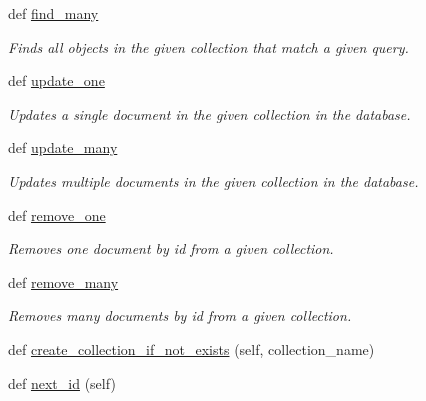 \begin{DoxyCompactItemize}
def \hyperlink{classNEAT__PyGenetics_1_1NEAT_1_1Tests_1_1MockClasses_1_1mock__DatabaseConnector_1_1mock__DatabaseConnector_a0ea2557b31cd7af3af9e098cc8dd3f7d}{find\+\_\+many}
\begin{DoxyCompactList}\small\item\em Finds all objects in the given collection that match a given query. \end{DoxyCompactList}\item 
def \hyperlink{classNEAT__PyGenetics_1_1NEAT_1_1Tests_1_1MockClasses_1_1mock__DatabaseConnector_1_1mock__DatabaseConnector_a01f612634b7f3da00fb1b327dfa5b524}{update\+\_\+one}
\begin{DoxyCompactList}\small\item\em Updates a single document in the given collection in the database. \end{DoxyCompactList}\item 
def \hyperlink{classNEAT__PyGenetics_1_1NEAT_1_1Tests_1_1MockClasses_1_1mock__DatabaseConnector_1_1mock__DatabaseConnector_a9fa32e7c0e425396238b66ab8f3ffb5e}{update\+\_\+many}
\begin{DoxyCompactList}\small\item\em Updates multiple documents in the given collection in the database. \end{DoxyCompactList}\item 
def \hyperlink{classNEAT__PyGenetics_1_1NEAT_1_1Tests_1_1MockClasses_1_1mock__DatabaseConnector_1_1mock__DatabaseConnector_a534ae334b83f54bce7d32f66faf22440}{remove\+\_\+one}
\begin{DoxyCompactList}\small\item\em Removes one document by id from a given collection. \end{DoxyCompactList}\item 
def \hyperlink{classNEAT__PyGenetics_1_1NEAT_1_1Tests_1_1MockClasses_1_1mock__DatabaseConnector_1_1mock__DatabaseConnector_ab3ff82b4de49e912a56c7b3cd0a208ac}{remove\+\_\+many}
\begin{DoxyCompactList}\small\item\em Removes many documents by id from a given collection. \end{DoxyCompactList}\item 
def \hyperlink{classNEAT__PyGenetics_1_1NEAT_1_1Tests_1_1MockClasses_1_1mock__DatabaseConnector_1_1mock__DatabaseConnector_a9092111a34ce0573dace98120682e415}{create\+\_\+collection\+\_\+if\+\_\+not\+\_\+exists} (self, collection\+\_\+name)
\item 
def \hyperlink{classNEAT__PyGenetics_1_1NEAT_1_1Tests_1_1MockClasses_1_1mock__DatabaseConnector_1_1mock__DatabaseConnector_a7172e251a453e9481d7c8359b6961105}{next\+\_\+id} (self)
\end{DoxyCompactItemize}
